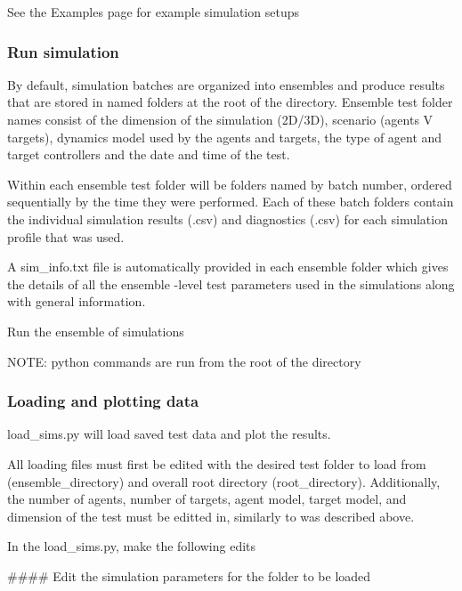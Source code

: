 See the Examples page for example simulation setups

\subsubsection*{Run simulation}

By default, simulation batches are organized into ensembles and produce results that are stored in named folders at the root of the directory. Ensemble test folder names consist of the dimension of the simulation (2D/3D), scenario (agents V targets), dynamics model used by the agents and targets, the type of agent and target controllers and the date and time of the test.

Within each ensemble test folder will be folders named by batch number, ordered sequentially by the time they were performed. Each of these batch folders contain the individual simulation results (.csv) and diagnostics (.csv) for each simulation profile that was used.

A sim\+\_\+info.\+txt file is automatically provided in each ensemble folder which gives the details of all the ensemble -\/level test parameters used in the simulations along with general information.

Run the ensemble of simulations 
\begin{DoxyCode}{0}
\end{DoxyCode}


N\+O\+TE\+: python commands are run from the root of the directory

\subsubsection*{Loading and plotting data}

load\+\_\+sims.\+py will load saved test data and plot the results.

All loading files must first be edited with the desired test folder to load from (ensemble\+\_\+directory) and overall root directory (root\+\_\+directory). Additionally, the number of agents, number of targets, agent model, target model, and dimension of the test must be editted in, similarly to was described above.

In the load\+\_\+sims.\+py, make the following edits

\#\#\#\# Edit the simulation parameters for the folder to be loaded 
\begin{DoxyCode}{0}
\DoxyCodeLine{\#\#\#\#\#\#\#\#\#\#\#\#\#\#\#\#\#\#\#\#\#\#\#\#\#\#\#\#\#\#\#\#\#\#\#\#\#\#\#\#\#\#\#\#\#\#\#\#\#\#\#\#\#\#\#\#\#\#\#\#\#\#\#\#\#\#\#\#\#\#\#\#\#}
\DoxyCodeLine{}
\DoxyCodeLine{}
\DoxyCodeLine{}
\end{DoxyCode}



